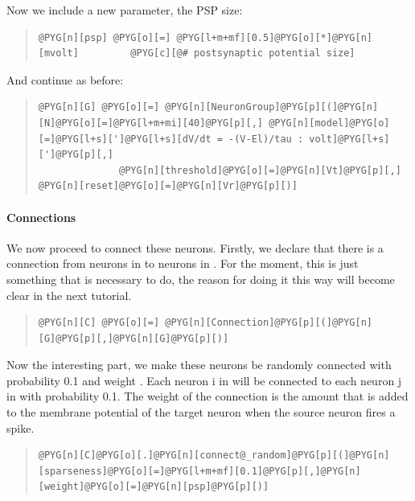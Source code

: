 \documentclass[letterpaper,10pt,english]{manual}
\begin{document}
Now we include a new parameter, the PSP size:
\begin{quote}

\begin{Verbatim}[commandchars=@\[\]]
@PYG[n][psp] @PYG[o][=] @PYG[l+m+mf][0.5]@PYG[o][*]@PYG[n][mvolt]         @PYG[c][@# postsynaptic potential size]
\end{Verbatim}
\end{quote}

And continue as before:
\begin{quote}

\begin{Verbatim}[commandchars=@\[\]]
@PYG[n][G] @PYG[o][=] @PYG[n][NeuronGroup]@PYG[p][(]@PYG[n][N]@PYG[o][=]@PYG[l+m+mi][40]@PYG[p][,] @PYG[n][model]@PYG[o][=]@PYG[l+s][']@PYG[l+s][dV/dt = -(V-El)/tau : volt]@PYG[l+s][']@PYG[p][,]
              @PYG[n][threshold]@PYG[o][=]@PYG[n][Vt]@PYG[p][,] @PYG[n][reset]@PYG[o][=]@PYG[n][Vr]@PYG[p][)]
\end{Verbatim}
\end{quote}


\paragraph{Connections}

We now proceed to connect these neurons. Firstly, we declare
that there is a connection from neurons in  to neurons in .
For the moment, this is just something that is necessary to
do, the reason for doing it this way will become clear in the
next tutorial.
\begin{quote}

\begin{Verbatim}[commandchars=@\[\]]
@PYG[n][C] @PYG[o][=] @PYG[n][Connection]@PYG[p][(]@PYG[n][G]@PYG[p][,]@PYG[n][G]@PYG[p][)]
\end{Verbatim}
\end{quote}

Now the interesting part, we make these neurons be randomly
connected with probability 0.1 and weight . Each neuron
i in  will be connected to each neuron j in 
with probability 0.1. The weight of the connection is the
amount that is added to the membrane potential of the target
neuron when the source neuron fires a spike.
\begin{quote}

\begin{Verbatim}[commandchars=@\[\]]
@PYG[n][C]@PYG[o][.]@PYG[n][connect@_random]@PYG[p][(]@PYG[n][sparseness]@PYG[o][=]@PYG[l+m+mf][0.1]@PYG[p][,]@PYG[n][weight]@PYG[o][=]@PYG[n][psp]@PYG[p][)]
\end{Verbatim}
\end{quote}
\end{document}
